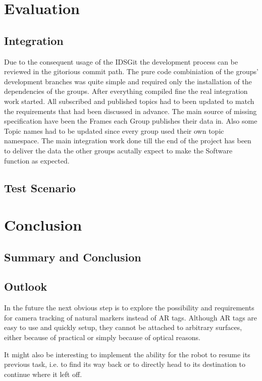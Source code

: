 \chapter{Evaluation}
\section{Integration}
Due to the consequent usage of the IDSGit the development process can be reviewed in the gitorious commit path. The pure code combiniation of the groups' development branches was quite simple and required only the installation of the dependencies of the groups. After everything compiled fine the real integration work started. All subscribed and published topics had to been updated to match the requirements that had been discussed in advance. The main source of missing specification have been the Frames each Group publishes their data in. Also some Topic names had to be updated since every group used their own topic namespace.
The main integration work done till the end of the project has been to deliver the data the other groups acutally expect to make the Software function as expected.
\section{Test Scenario}
\chapter{Conclusion}
\section{Summary and Conclusion}
\section{Outlook}
In the future the next obvious step is to explore the possibility and requirements for camera tracking of natural markers instead of AR tags. Although AR tags are easy to use and quickly setup, they cannot be attached to arbitrary surfaces, either because of practical or simply because of optical reasons.

It might also be interesting to implement the ability for the robot to resume its previous task, i.e. to find its way back or to directly head to its destination to continue where it left off.